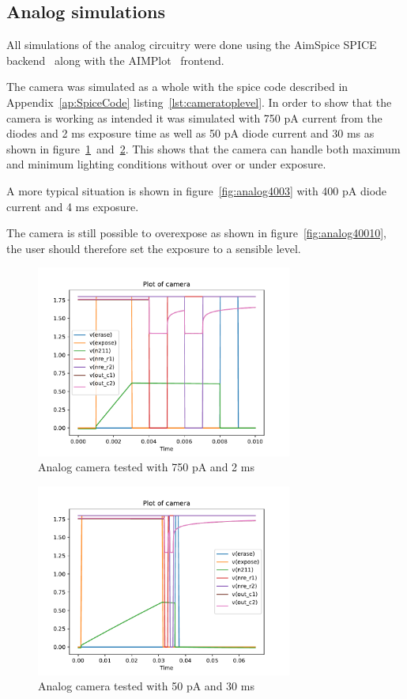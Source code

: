 \subsection{Analog simulations}

All simulations of the analog circuitry were done using the AimSpice SPICE backend~\cite{AIMSpice} along with the AIMPlot~\cite{aimplot} frontend.

The camera was simulated as a whole with the spice code described in Appendix~\ref{ap:SpiceCode} listing~\ref{lst:cameratoplevel}.
In order to show that the camera is working as intended it was simulated with 750 pA current from the diodes and 2 ms exposure time as well as 50 pA diode current and 30 ms as shown in figure~\ref{fig:analog7502}~and~\ref{fig:analog5030}.
This shows that the camera can handle both maximum and minimum lighting conditions without over or under exposure.

A more typical situation is shown in figure~\ref{fig:analog4003} with 400 pA diode current and 4 ms exposure.

The camera is still possible to overexpose as shown in figure~\ref{fig:analog40010}, the user should therefore set the exposure to a sensible level.

\begin{figure}[H]
  \centering
  \includegraphics[width=0.75\textwidth]{../analog/camera7502}
  \caption{Analog camera tested with 750 pA and 2 ms}
  \label{fig:analog7502}
\end{figure}

\begin{figure}[H]
  \centering
  \includegraphics[width=0.75\textwidth]{../analog/camera5030}
  \caption{Analog camera tested with 50 pA and 30 ms}
  \label{fig:analog5030}
\end{figure}

